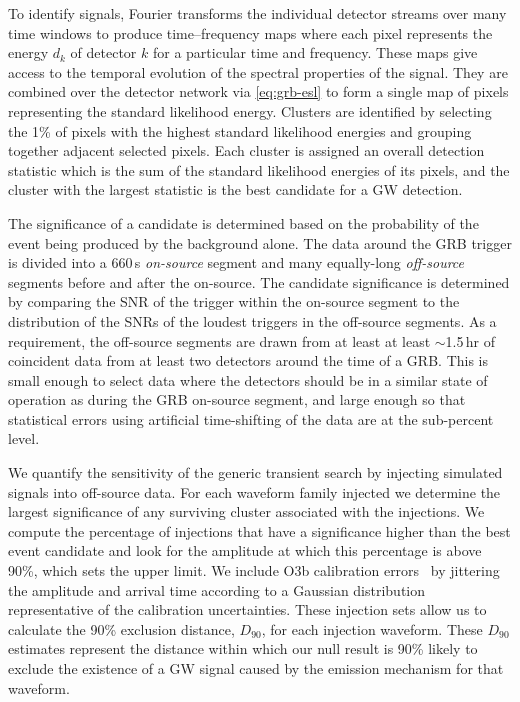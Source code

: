 To identify signals, \xpip Fourier transforms the individual detector streams over many time windows to produce time–frequency maps where each pixel represents the energy $d_k$ of detector $k$ for a particular time and frequency.
These maps give access to the temporal evolution of the spectral properties of the signal.
They are combined over the detector network via \cref{eq:grb-esl} to form a single map of pixels representing the standard likelihood energy.
Clusters are identified by selecting the 1\% of pixels with the highest standard likelihood energies and grouping together adjacent selected pixels.
Each cluster is assigned an overall detection statistic which is the sum of the standard likelihood energies of its pixels, and the cluster with the largest statistic is the best candidate for a GW detection.

The significance of a candidate is determined based on the probability of the event being produced by the background alone.
The data around the GRB trigger is divided into a 660\,s \textit{on-source} segment and many equally-long \textit{off-source} segments before and after the on-source.
The candidate significance is determined by comparing the \ac{SNR} of the trigger within the on-source segment to the distribution of the \acp{SNR} of the loudest triggers in the off-source segments.
As a requirement, the off-source segments are drawn from at least at least $\sim$1.5\,hr of coincident data from at least two detectors around the time of a \ac{GRB}.
This is small enough to select data where the detectors should be in a similar state of operation as during the \ac{GRB} on-source segment, and large enough so that statistical errors using artificial time-shifting of the data are at the sub-percent level.

We quantify the sensitivity of the generic transient search by injecting simulated signals into off-source data.
For each waveform family injected we determine the largest significance of any surviving cluster associated with the injections.
We compute the percentage of injections that have a significance higher than the best event candidate and look for the amplitude at which this percentage is above 90\%, which sets the upper limit.
We include O3b calibration errors~\citep{Acernese_2022, Sun_2021} by jittering the amplitude and arrival time according to a Gaussian distribution representative of the calibration uncertainties.
These injection sets allow us to calculate the 90\% exclusion distance, $D_{90}$, for each injection waveform.
These $D_{90}$ estimates represent the distance within which our null result is 90\% likely to exclude the existence of a \ac{GW} signal caused by the emission mechanism for that waveform.

